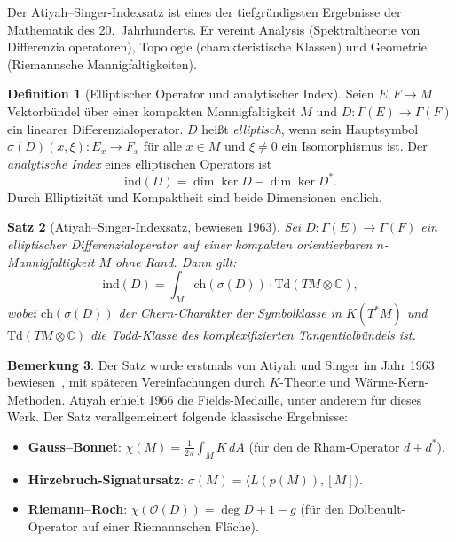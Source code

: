 \documentclass[12pt,a4paper]{amsart}
\newtheorem{theorem}{Satz}[section]
\theoremstyle{definition}
\newtheorem{definition}[theorem]{Definition}
\newtheorem{remark}[theorem]{Bemerkung}
\begin{document}
Der Atiyah--Singer-Indexsatz ist eines der tiefgründigsten Ergebnisse der
Mathematik des 20.\ Jahrhunderts. Er vereint Analysis (Spektraltheorie
von Differenzialoperatoren), Topologie (charakteristische Klassen) und
Geometrie (Riemannsche Mannigfaltigkeiten).

\begin{definition}[Elliptischer Operator und analytischer Index]
Seien $E, F \to M$ Vektorbündel über einer kompakten Mannigfaltigkeit $M$ und
$D \colon \Gamma(E) \to \Gamma(F)$ ein linearer Differenzialoperator. $D$
heißt \emph{elliptisch}, wenn sein Hauptsymbol
$\sigma(D)(x, \xi) \colon E_x \to F_x$ für alle $x \in M$ und $\xi \neq 0$
ein Isomorphismus ist. Der \emph{analytische Index} eines elliptischen
Operators ist
\[
  \mathrm{ind}(D) = \dim \ker D - \dim \ker D^*.
\]
Durch Elliptizität und Kompaktheit sind beide Dimensionen endlich.
\end{definition}

\begin{theorem}[Atiyah--Singer-Indexsatz, bewiesen 1963]
\label{thm:indexsatz}
Sei $D \colon \Gamma(E) \to \Gamma(F)$ ein elliptischer Differenzialoperator
auf einer kompakten orientierbaren $n$-Mannigfaltigkeit $M$ ohne Rand. Dann gilt:
\[
  \mathrm{ind}(D) = \int_M \mathrm{ch}(\sigma(D)) \cdot \mathrm{Td}(TM \otimes \mathbb{C}),
\]
wobei $\mathrm{ch}(\sigma(D))$ der Chern-Charakter der Symbolklasse in $K(T^*M)$
und $\mathrm{Td}(TM \otimes \mathbb{C})$ die Todd-Klasse des komplexifizierten
Tangentialbündels ist.
\end{theorem}

\begin{remark}
Der Satz wurde erstmals von Atiyah und Singer im Jahr 1963 bewiesen~\cite{atiyahsinger1963},
mit späteren Vereinfachungen durch $K$-Theorie und Wärme-Kern-Methoden. Atiyah
erhielt 1966 die Fields-Medaille, unter anderem für dieses Werk. Der Satz
verallgemeinert folgende klassische Ergebnisse:
\begin{itemize}[noitemsep]
  \item \textbf{Gauss--Bonnet}: $\chi(M) = \frac{1}{2\pi}\int_M K\, dA$
        (für den de Rham-Operator $d + d^*$).
  \item \textbf{Hirzebruch-Signatursatz}: $\sigma(M) = \langle L(p(M)), [M]\rangle$.
  \item \textbf{Riemann--Roch}: $\chi(\mathcal{O}(D)) = \deg D + 1 - g$
        (für den Dolbeault-Operator auf einer Riemannschen Fläche).
\end{itemize}
\end{remark}
\end{document}
